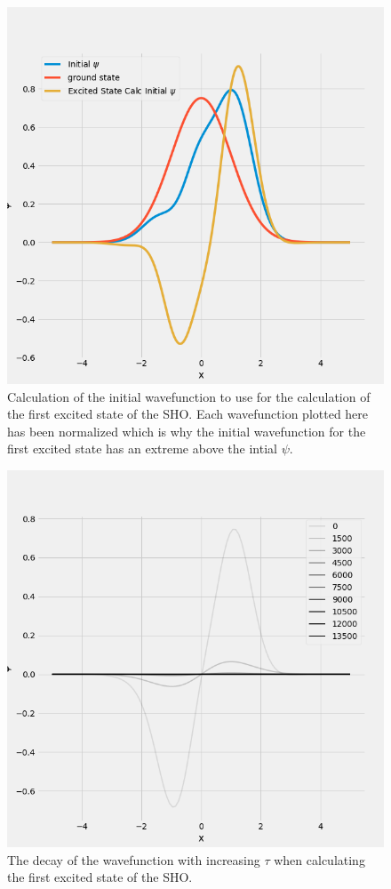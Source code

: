 \documentclass[]{article}
\begin{document}
\begin{figure}
	\centering
	\includegraphics[width=.8\textwidth]{figures/excited_init.png}
	\caption{Calculation of the initial wavefunction to use for the calculation of the first excited state of the SHO. Each wavefunction plotted here has been normalized which is why the initial wavefunction for the first excited state has an extreme above the intial $\psi$.}
	\label{fig:sho_excited_init}
\end{figure}
\begin{figure}
	\centering
	\includegraphics[width=.8\textwidth]{figures/e1_state_decay.png}
	\caption{The decay of the wavefunction with increasing $\tau$ when calculating the first excited state of the SHO.}
	\label{fig:sho_excited_decay}
\end{figure}
\end{document}
